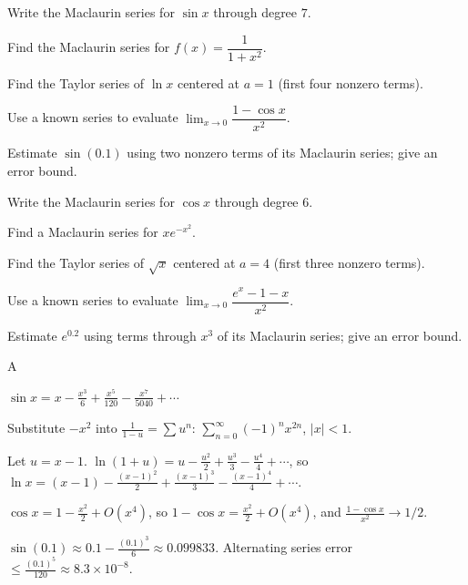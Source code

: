 \documentclass[11pt]{article}
\begin{document}
\begin{problems}
\item Write the Maclaurin series for $\sin x$ through degree $7$.
\item Find the Maclaurin series for $f(x) = \dfrac{1}{1 + x^2}$.
\item Find the Taylor series of $\ln x$ centered at $a = 1$ (first four nonzero terms).
\item Use a known series to evaluate $\displaystyle \lim_{x \to 0} \dfrac{1 - \cos x}{x^2}$.
\item Estimate $\sin(0.1)$ using two nonzero terms of its Maclaurin series; give an error bound.
\end{problems}

\vfill
\newpage
{}
\begin{problems}
\item Write the Maclaurin series for $\cos x$ through degree $6$.
\item Find a Maclaurin series for $x e^{-x^2}$.
\item Find the Taylor series of $\sqrt{x}$ centered at $a = 4$ (first three nonzero terms).
\item Use a known series to evaluate $\displaystyle \lim_{x \to 0} \dfrac{e^x - 1 - x}{x^2}$.
\item Estimate $e^{0.2}$ using terms through $x^3$ of its Maclaurin series; give an error bound.
\end{problems}

\vfill
\newpage
{}

\begin{answers}{A}
\item $\sin x = x - \tfrac{x^3}{6} + \tfrac{x^5}{120} - \tfrac{x^7}{5040} + \cdots$
\item Substitute $-x^2$ into $\tfrac{1}{1-u} = \sum u^n$: $\boxed{\sum_{n=0}^\infty (-1)^n x^{2n}}$, $|x|<1$.
\item Let $u = x - 1$. $\ln(1 + u) = u - \tfrac{u^2}{2} + \tfrac{u^3}{3} - \tfrac{u^4}{4} + \cdots$, so $\ln x = (x-1) - \tfrac{(x-1)^2}{2} + \tfrac{(x-1)^3}{3} - \tfrac{(x-1)^4}{4} + \cdots$.
\item $\cos x = 1 - \tfrac{x^2}{2} + O(x^4)$, so $1 - \cos x = \tfrac{x^2}{2} + O(x^4)$, and $\tfrac{1-\cos x}{x^2} \to \boxed{1/2}$.
\item $\sin(0.1) \approx 0.1 - \tfrac{(0.1)^3}{6} \approx 0.099833$. Alternating series error $\le \tfrac{(0.1)^5}{120} \approx 8.3 \times 10^{-8}$.
\end{answers}
\end{document}
